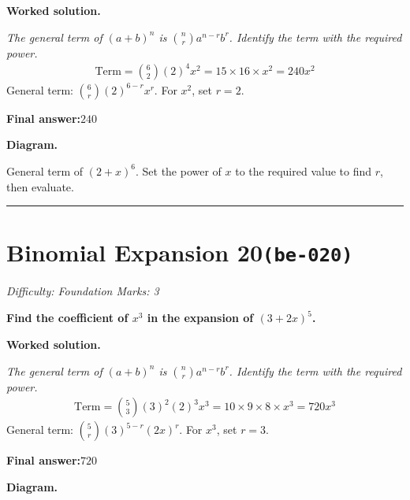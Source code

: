 \documentclass[11pt]{article}
\newcommand{\question}[1]{\par\medskip\noindent\textbf{#1}\par}
\begin{document}
\textbf{Worked solution.}

\textit{The general term of \((a+b)^n\) is \(\binom{n}{r} a^{n-r} b^r\). Identify the term with the required power.}
\[\begin{gathered}
\text{Term} = \binom{6}{2}(2)^4 x^2 = 15 \times 16 \times x^2 = 240x^2
\end{gathered}\]
General term: \( \binom{6}{r}(2)^{6-r} x^r \). For \(x^2\), set \(r = 2\).

\begin{answerbox}
\textbf{Final answer:}\quad \(\displaystyle 240\)
\end{answerbox}
\textbf{Diagram.}

\begin{center}
\end{center}
\small General term of $\left(2+x\right)^{6}$. Set the power of $x$ to the required value to find $r$, then evaluate.\normalsize

\medskip\hrule

\section*{Binomial Expansion 20\quad\small\texttt{(be-020)}}
\textit{Difficulty: Foundation \quad\textbar\quad Marks: 3}

\question{Find the coefficient of \( x^3 \) in the expansion of \( (3 + 2x)^5 \).}

\textbf{Worked solution.}

\textit{The general term of \((a+b)^n\) is \(\binom{n}{r} a^{n-r} b^r\). Identify the term with the required power.}
\[\begin{gathered}
\text{Term} = \binom{5}{3}(3)^2(2)^3 x^3 = 10 \times 9 \times 8 \times x^3 = 720x^3
\end{gathered}\]
General term: \( \binom{5}{r}(3)^{5-r}(2x)^r \). For \(x^3\), set \(r = 3\).

\begin{answerbox}
\textbf{Final answer:}\quad \(\displaystyle 720\)
\end{answerbox}
\textbf{Diagram.}
\end{document}
